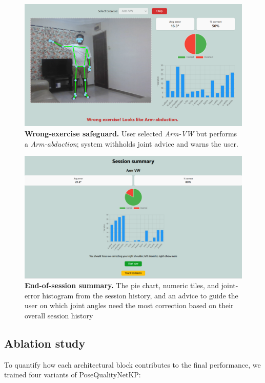 \documentclass{article}
\begin{document}
\begin{figure}[H]
  \centering
  \includegraphics[width=.9\linewidth]{figs/wrong_exercise.png}
  \caption{\textbf{Wrong-exercise safeguard.}
           User selected \emph{Arm-VW} but performs a \emph{Arm-abduction}; system withholds joint advice and warns the user.}
  \label{fig:wrong_exercise}
\end{figure}

\begin{figure}[H]
  \centering
  \includegraphics[width=.9\linewidth]{figs/summary_page.png}
  \caption{\textbf{End-of-session summary.}
           The pie chart, numeric tiles, and joint-error histogram from the session history, and an advice to guide the user on which joint angles need the most correction based on their overall session history}
  \label{fig:summary_page}
\end{figure}

\subsection{Ablation study}
\label{sec:ablation}

To quantify how each architectural block contributes to the final
performance, we trained four variants of PoseQualityNetKP:
\end{document}
